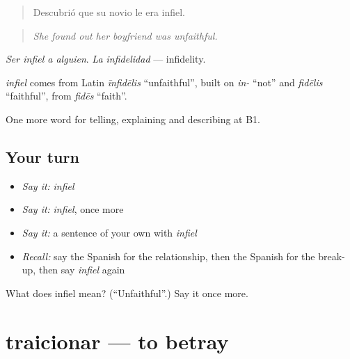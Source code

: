 \begin{quote}
Descubrió que su novio le era infiel.
\end{quote}

\begin{quote}
\emph{She found out her boyfriend was unfaithful.}
\end{quote}

\emph{Ser infiel a alguien}. \emph{La infidelidad} — infidelity.

\begin{cousinweb}
\emph{infiel} comes from Latin \emph{īnfidēlis} \textquotedblleft{}unfaithful\textquotedblright{}, built on \emph{in-} \textquotedblleft{}not\textquotedblright{} and \emph{fidēlis} \textquotedblleft{}faithful\textquotedblright{}, from \emph{fidēs} \textquotedblleft{}faith\textquotedblright{}.
\end{cousinweb}

\begin{grammarlens}[title={What you've built}]
One more word for telling, explaining and describing at B1.
\end{grammarlens}

\subsection*{Your turn}
\begin{itemize}
\raggedright
  \item \emph{Say it:} \emph{infiel}
  \item \emph{Say it:} \emph{infiel}, once more
  \item \emph{Say it:} a sentence of your own with \emph{infiel}
  \item \emph{Recall:} say the Spanish for the relationship, then the Spanish for the break-up, then say \emph{infiel} again
\end{itemize}

\begin{tcolorbox}[breakable,colback=teal!4,colframe=teal!35!black,title={Before you move on}]
What does infiel mean? (\textquotedblleft{}Unfaithful\textquotedblright{}.) Say it once more.
\end{tcolorbox}
\section[traicionar]{traicionar — to betray}

\label{lesson:ES-C745-traicionar}



